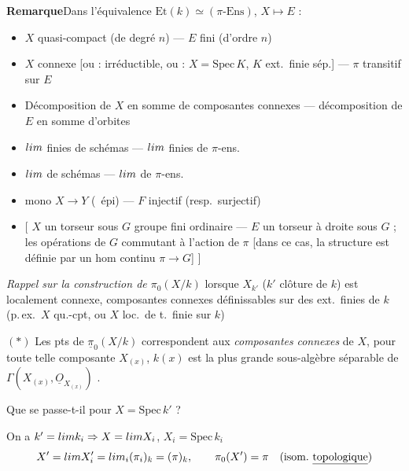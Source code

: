 \documentclass[11pt,a4paper]{article}
\begin{document}
\textbf{Remarque}\quad Dans l'équivalence
$\mathrm{Et}(k) \simeq (\pi\text{-Ens})$, $X \mapsto E$ :
\begin{itemize}
  \item $X$ quasi-compact (de degré $n$) \quad --- \quad $E$ fini (d'ordre $n$)
  \item \struck{\ill{}} $X$ connexe [ou : irréductible, ou : $X = \mathrm{Spec}\,K$,
    $K$ ext.\ finie sép.] \quad --- \quad $\pi$ transitif sur $E$
  \item Décomposition de $X$ en somme de composantes connexes \quad --- \quad
    décomposition de $E$ en somme d'orbites
  \item $\varprojlim$ finies de schémas \quad --- \quad $\varprojlim$ finies de $\pi$-ens.
  \item $\varinjlim$ \struck{\ill{}} de schémas \quad --- \quad $\varinjlim$ de $\pi$-ens.
  \item mono $X \to Y$ (\ épi) \quad --- \quad $F$ injectif (resp.\ surjectif)
  \item $[$ $X$ un torseur sous $G$ \struck{\ill{}} groupe fini ordinaire \quad --- \quad
    $E$ un torseur à droite sous $G$ ; les opérations de $G$ commutant à
    l'action de $\pi$ [dans ce cas, la structure est définie par un hom
    continu $\pi \to G$] $]$
\end{itemize}

\emph{Rappel sur la construction de $\pi_0(X/k)$} lorsque
\struck{\ill{}} \struck{\ill{}} $X_{k'}$ ($k'$ clôture \ill{} de $k$) est
localement connexe,   composantes connexes
définissables sur des ext.\ finies de $k$ (p.\,ex.\ $X$ qu.-cpt, ou $X$
loc.\ de t.\ finie sur $k$)

$(*)$ Les pts de $\underline{\pi}_0(X/k)$ correspondent aux
\emph{composantes} \emph{connexes} de $X$, pour toute telle
composante $X_{(x)}$, $k(x)$ est la plus grande sous-algèbre
\struck{\ill{}} séparable de $\Gamma(X_{(x)}, \underline{O}_{X_{(x)}})$
.

Que se passe-t-il pour $X = \mathrm{Spec}\,k'$ ?

On a $k' = \varinjlim k_i \Rightarrow X = \varprojlim X_i$, $X_i = \mathrm{Spec}\,k_i$
\[
  X' = \varprojlim X'_i = \varprojlim_i (\pi_i)_k = (\pi)_k , \qquad
  \pi_0(X') = \pi \quad (\text{isom.\ \underline{topologique}})
\]
\end{document}
